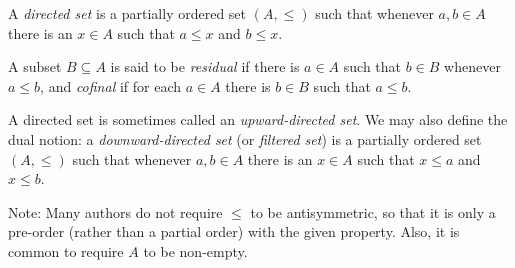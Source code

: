 \documentclass[12pt]{article}
\begin{document}

A \emph{directed set} is a partially ordered set $(A, \leq)$ such that whenever $a,b\in A$ there is an $x\in A$ such that $a\leq x$ and $b\leq x$.

A subset $B\subseteq A$ is said to be \emph{residual} if there is $a\in A$ such that $b\in B$ whenever $a\leq b$, and \emph{cofinal} if for each $a\in A$ there is $b\in B$ such that $a\leq b$.

A directed set is sometimes called an \emph{upward-directed set}.
We may also define the dual notion:
a \emph{downward-directed set} (or \emph{filtered set}) is a partially ordered set $(A, \leq)$ such that whenever $a,b\in A$ there is an $x\in A$ such that $x\leq a$ and $x\leq b$.

Note: Many authors do not require $\leq$ to be antisymmetric,
so that it is only a pre-order (rather than a partial order)
with the given property.
Also, it is common to require $A$ to be non-empty.


\end{document}
